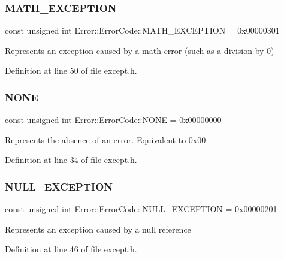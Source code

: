 \subsubsection{\texorpdfstring{M\+A\+T\+H\+\_\+\+E\+X\+C\+E\+P\+T\+I\+ON}{MATH\_EXCEPTION}}
{\footnotesize\ttfamily const unsigned int Error\+::\+Error\+Code\+::\+M\+A\+T\+H\+\_\+\+E\+X\+C\+E\+P\+T\+I\+ON = 0x00000301}

Represents an exception caused by a math error (such as a division by 0) 

Definition at line 50 of file except.\+h.

\hypertarget{namespace_error_1_1_error_code_a257bb41202c970fe16218971c3865153}{}\label{namespace_error_1_1_error_code_a257bb41202c970fe16218971c3865153} 
\subsubsection{\texorpdfstring{N\+O\+NE}{NONE}}
{\footnotesize\ttfamily const unsigned int Error\+::\+Error\+Code\+::\+N\+O\+NE = 0x00000000}

Represents the absence of an error. Equivalent to 0x00 

Definition at line 34 of file except.\+h.

\hypertarget{namespace_error_1_1_error_code_a16746831d05707d52cb441c12ed4b471}{}\label{namespace_error_1_1_error_code_a16746831d05707d52cb441c12ed4b471} 
\subsubsection{\texorpdfstring{N\+U\+L\+L\+\_\+\+E\+X\+C\+E\+P\+T\+I\+ON}{NULL\_EXCEPTION}}
{\footnotesize\ttfamily const unsigned int Error\+::\+Error\+Code\+::\+N\+U\+L\+L\+\_\+\+E\+X\+C\+E\+P\+T\+I\+ON = 0x00000201}

Represents an exception caused by a null reference 

Definition at line 46 of file except.\+h.

